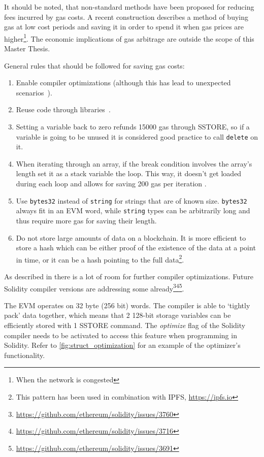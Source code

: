 It should be noted, that non-standard methods have been proposed for reducing fees incurred by gas costs. A recent construction \cite{gastoken} describes a method of buying gas at low cost periods and saving it in order to spend it when gas prices are higher\footnote{When the network is congested}. The economic implications of gas arbitrage are outside the scope of this Master Thesis. 

General rules that should be followed for saving gas costs:
\begin{enumerate}
    \item Enable compiler optimizations (although this has lead to unexpected scenarios~\cite{compiler}).
    \item Reuse code through libraries~\cite{library}.
    \item Setting a variable back to zero refunds 15000 gas through SSTORE, so if a variable is going to be unused it is considered good practice to call \texttt{delete} on it. 
    \item When iterating through an array, if the break condition involves the array's length set it as a stack variable the loop. This way, it doesn't get loaded during each loop and allows for saving 200 gas per iteration \cite{DBLP:journals/corr/ChenLLZ17}.
    \item Use \texttt{bytes32} instead of \texttt{string} for strings that are of known size. \texttt{bytes32} always fit in an EVM word, while \texttt{string} types can be arbitrarily long and thus require more gas for saving their length.
    \item Do not store large amounts of data on a blockchain. It is more efficient to store a hash which can be either proof of the existence of the data at a point in time, or it can be a hash pointing to the full data\footnote{This pattern has been used in combination with IPFS, \url{https://ipfs.io}}.
\end{enumerate}

As described in \cite{DBLP:journals/corr/ChenLLZ17} there is a lot of room for further compiler optimizations. Future Solidity compiler versions are addressing some already\footnote{\url{https://github.com/ethereum/solidity/issues/3760}}\footnote{\url{https://github.com/ethereum/solidity/issues/3716}}\footnote{\url{https://github.com/ethereum/solidity/issues/3691}}.

The EVM operates on 32 byte (256 bit) words. The compiler is able to `tightly pack' data together, which means that 2 128-bit storage variables can be efficiently stored with 1 SSTORE command. The \textit{optimize} flag of the Solidity compiler needs to be activated to access this feature when programming in Solidity. Refer to \ref{fig:struct_optimization} for an example of the optimizer's functionality.

